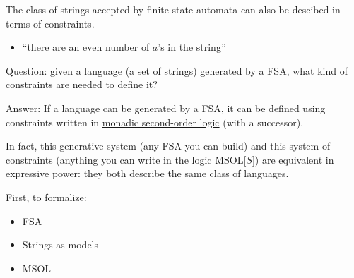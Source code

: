 \documentclass{beamer}
\begin{document}
\begin{frame}
The class of strings accepted by finite state automata can also be descibed in terms of constraints. 
\begin{itemize}
\item ``there are an even number of $a$'s in the string''
\end{itemize}

\pause

\begin{block}{Question:}
given a language (a set of strings) generated by a FSA, what kind of constraints are needed to define it?
\end{block}
\pause
\begin{block}{Answer:}
If a language can be generated by a FSA, it can be defined using constraints written in \underline{monadic second-order logic} (with a successor).
\end{block}

\end{frame}



\begin{frame}
In fact, this generative system (any FSA you can build) and this system of constraints (anything you can write in the logic MSOL[$S$]) are equivalent in expressive power: they both describe the same class of languages.

\pause

First, to formalize:
\begin{itemize}
\item FSA
\item Strings as models
\item MSOL
\end{itemize}
\end{frame}


\end{document}
